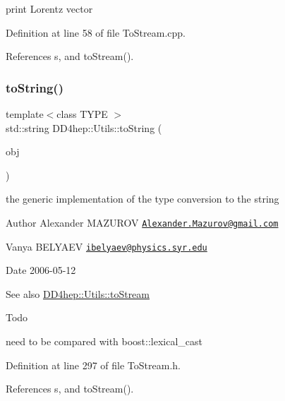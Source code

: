 print Lorentz vector 



Definition at line 58 of file To\+Stream.\+cpp.



References s, and to\+Stream().

\hypertarget{namespace_d_d4hep_1_1_utils_a4e482234503764883507107b417e1de2}{}\label{namespace_d_d4hep_1_1_utils_a4e482234503764883507107b417e1de2} 
\subsubsection{\texorpdfstring{to\+String()}{toString()}}
{\footnotesize\ttfamily template$<$class T\+Y\+PE $>$ \\
std\+::string D\+D4hep\+::\+Utils\+::to\+String (\begin{DoxyParamCaption}\item[{const T\+Y\+PE \&}]{obj }\end{DoxyParamCaption})\hspace{0.3cm}{\ttfamily [inline]}}

the generic implementation of the type conversion to the string \begin{DoxyAuthor}{Author}
Alexander M\+A\+Z\+U\+R\+OV \href{mailto:Alexander.Mazurov@gmail.com}{\tt Alexander.\+Mazurov@gmail.\+com} 

Vanya B\+E\+L\+Y\+A\+EV \href{mailto:ibelyaev@physics.syr.edu}{\tt ibelyaev@physics.\+syr.\+edu} 
\end{DoxyAuthor}
\begin{DoxyDate}{Date}
2006-\/05-\/12 
\end{DoxyDate}
\begin{DoxySeeAlso}{See also}
\hyperlink{namespace_d_d4hep_1_1_utils_ab016d8d624f13c9f5470910f2057b860}{D\+D4hep\+::\+Utils\+::to\+Stream} 
\end{DoxySeeAlso}
\begin{DoxyRefDesc}{Todo}
\item[\hyperlink{todo__todo000002}{Todo}]need to be compared with boost\+::lexical\+\_\+cast \end{DoxyRefDesc}


Definition at line 297 of file To\+Stream.\+h.



References s, and to\+Stream().

